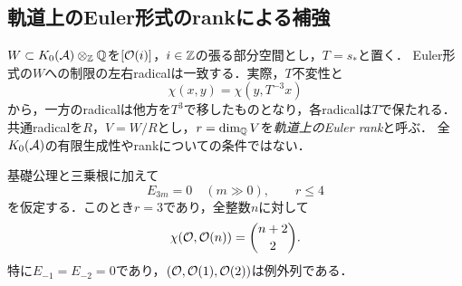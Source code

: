 \subsection{軌道上のEuler形式のrankによる補強}
$W\subset K_0(\mathcal A)\otimes_\mathbb Z\mathbb Q$を$[\mathcal O(i)]$，$i\in\mathbb Z$の張る部分空間とし，$T=s_*$と置く．
Euler形式の$W$への制限の左右radicalは一致する．実際，$T$不変性と
\begin{equation}\label{eq:numericalserre}
 \chi(x,y)=\chi(y,T^{-3}x)
\end{equation}
から，一方のradicalは他方を$T^3$で移したものとなり，各radicalは$T$で保たれる．
共通radicalを$R$，$V=W/R$とし，$r=\dim_\mathbb Q V$を\emph{軌道上のEuler rank}と呼ぶ．
全$K_0(\mathcal A)$の有限生成性やrankについての条件ではない．

\begin{theorem}\label{thm:numericalrank}
基礎公理と三乗根に加えて
\begin{equation}\label{eq:rankhyp}
 E_{3m}=0\quad(m\gg0),\qquad r\leq4
\end{equation}
を仮定する．このとき$r=3$であり，全整数$n$に対して
\[
 \chi(\mathcal O,\mathcal O(n))=\binom{n+2}{2}.
\]
特に$E_{-1}=E_{-2}=0$であり，$(\mathcal O,\mathcal O(1),\mathcal O(2))$は例外列である．
\end{theorem}
